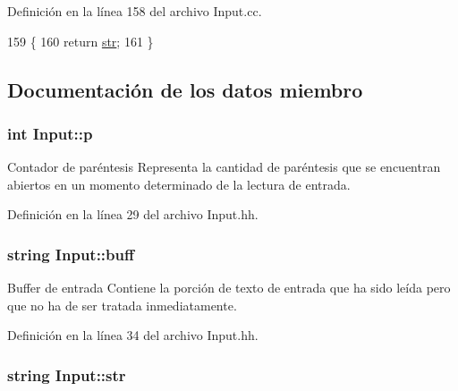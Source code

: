 Definición en la línea 158 del archivo Input.\+cc.


\begin{DoxyCode}
159 \{
160   \textcolor{keywordflow}{return} \hyperlink{class_input_a0c2550eda9a6250028748d8870f4e83f}{str};
161 \}
\end{DoxyCode}


\subsection{Documentación de los datos miembro}
\subsubsection[{\texorpdfstring{p}{p}}]{\setlength{\rightskip}{0pt plus 5cm}int Input\+::p\hspace{0.3cm}{\ttfamily [private]}}\hypertarget{class_input_abd6df3e98127cbfeccea2d15b8d1114b}{}\label{class_input_abd6df3e98127cbfeccea2d15b8d1114b}


Contador de paréntesis Representa la cantidad de paréntesis que se encuentran abiertos en un momento determinado de la lectura de entrada. 



Definición en la línea 29 del archivo Input.\+hh.

\subsubsection[{\texorpdfstring{buff}{buff}}]{\setlength{\rightskip}{0pt plus 5cm}string Input\+::buff\hspace{0.3cm}{\ttfamily [private]}}\hypertarget{class_input_a680019c05e47ad35677d5cb692978d98}{}\label{class_input_a680019c05e47ad35677d5cb692978d98}


Buffer de entrada Contiene la porción de texto de entrada que ha sido leída pero que no ha de ser tratada inmediatamente. 



Definición en la línea 34 del archivo Input.\+hh.

\subsubsection[{\texorpdfstring{str}{str}}]{\setlength{\rightskip}{0pt plus 5cm}string Input\+::str\hspace{0.3cm}{\ttfamily [private]}}\hypertarget{class_input_a0c2550eda9a6250028748d8870f4e83f}{}\label{class_input_a0c2550eda9a6250028748d8870f4e83f}


